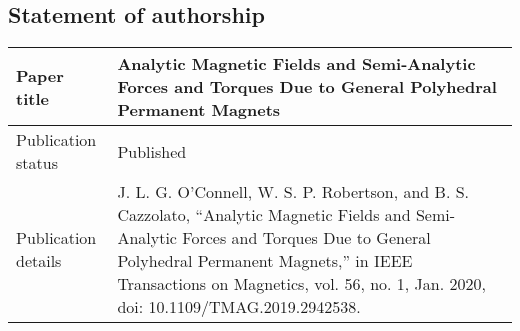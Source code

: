 \subsection*{Statement of authorship}
\renewcommand{\arraystretch}{1.5}
\begin{tabular}{m{} m{}}
    \hline \hline Paper title & Analytic Magnetic Fields and Semi-Analytic Forces and Torques Due to General Polyhedral Permanent Magnets \\ \hline
    Publication status & Published \\ \hline
    Publication details & J. L. G. O’Connell, W. S. P. Robertson, and B. S. Cazzolato, ``Analytic Magnetic Fields and Semi-Analytic Forces and Torques Due to General Polyhedral Permanent Magnets,'' in IEEE Transactions on Magnetics, vol. 56, no. 1, Jan. 2020, doi: 10.1109/TMAG.2019.2942538. \\ \hline \hline
\end{tabular}

\vfill

